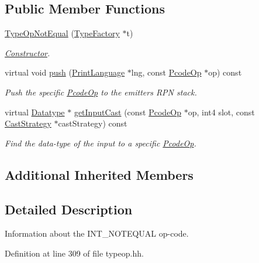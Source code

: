 \subsection*{Public Member Functions}
\begin{DoxyCompactItemize}
\item 
\mbox{\hyperlink{class_type_op_not_equal_a49ae763ca26037532e3a7615cacea682}{Type\+Op\+Not\+Equal}} (\mbox{\hyperlink{class_type_factory}{Type\+Factory}} $\ast$t)
\begin{DoxyCompactList}\small\item\em \mbox{\hyperlink{class_constructor}{Constructor}}. \end{DoxyCompactList}\item 
virtual void \mbox{\hyperlink{class_type_op_not_equal_a27576ad1c689ccde9d210583d3f1c8ea}{push}} (\mbox{\hyperlink{class_print_language}{Print\+Language}} $\ast$lng, const \mbox{\hyperlink{class_pcode_op}{Pcode\+Op}} $\ast$op) const
\begin{DoxyCompactList}\small\item\em Push the specific \mbox{\hyperlink{class_pcode_op}{Pcode\+Op}} to the emitter\textquotesingle{}s R\+PN stack. \end{DoxyCompactList}\item 
virtual \mbox{\hyperlink{class_datatype}{Datatype}} $\ast$ \mbox{\hyperlink{class_type_op_not_equal_a597b92a026250eb91ad74c5b6b279654}{get\+Input\+Cast}} (const \mbox{\hyperlink{class_pcode_op}{Pcode\+Op}} $\ast$op, int4 slot, const \mbox{\hyperlink{class_cast_strategy}{Cast\+Strategy}} $\ast$cast\+Strategy) const
\begin{DoxyCompactList}\small\item\em Find the data-\/type of the input to a specific \mbox{\hyperlink{class_pcode_op}{Pcode\+Op}}. \end{DoxyCompactList}\end{DoxyCompactItemize}
\subsection*{Additional Inherited Members}


\subsection{Detailed Description}
Information about the I\+N\+T\+\_\+\+N\+O\+T\+E\+Q\+U\+AL op-\/code. 

Definition at line 309 of file typeop.\+hh.



